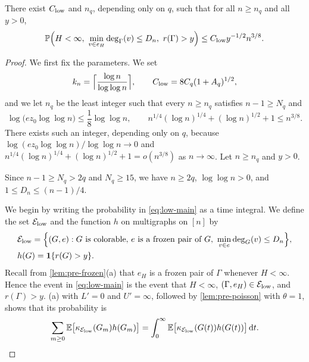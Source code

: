 \begin{theorem}\label{thm:low-main}
There exist $C_{\rm low}$ and $n_q$, depending only on $q$, such that for all $n \ge n_q$ and all $y > 0$,
\begin{equation}\label{eq:low-main}
\Pp\Bigl(H < \infty, \ \min_{v \in e_H} \deg_\Gamma(v) \le D_n, \ r(\Gamma) > y\Bigr) \le C_{\rm low} y^{-1/2} n^{3/8}.
\end{equation}
\end{theorem}

\begin{proof}
We first fix the parameters. We set
\begin{equation*}
k_n = \Bigl\lceil \frac{\log n}{\log \log n} \Bigr\rceil, \qquad C_{\rm low} = 8 C_q (1 + A_q)^{1/2},
\end{equation*}
and we let $n_q$ be the least integer such that every $n \ge n_q$ satisfies $n - 1 \ge N_q$ and
\begin{equation}\label{eq:low-conditions}
\log\bigl(e z_0 \log \log n\bigr) \le \frac{1}{8} \log \log n, \qquad n^{1/4} (\log n)^{1/4} + (\log n)^{1/2} + 1 \le n^{3/8}.
\end{equation}
There exists such an integer, depending only on $q$, because $\log(e z_0 \log \log n)/\log \log n \to 0$ and $n^{1/4} (\log n)^{1/4} + (\log n)^{1/2} + 1 = o(n^{3/8})$ as $n \to \infty$. Let $n \ge n_q$ and $y > 0$.

Since $n - 1 \ge N_q > 2q$ and $N_q \ge 15$, we have $n \ge 2q$, $\log \log n > 0$, and $1 \le D_n \le (n - 1)/4$.

We begin by writing the probability in \eqref{eq:low-main} as a time integral. We define the set $\mathcal E_{\rm low}$ and the function $h$ on multigraphs on $[n]$ by
\begin{equation*}
\begin{aligned}
&\mathcal E_{\rm low} = \Bigl\{(G, e) : G \text{ is colorable, } e \text{ is a frozen pair of } G, \ \min_{v \in e} \deg_G(v) \le D_n\Bigr\}, \\
&h(G) = \mathbf 1\{r(G) > y\}.
\end{aligned}
\end{equation*}
Recall from \cref{lem:pre-frozen}(a) that $e_H$ is a frozen pair of $\Gamma$ whenever $H < \infty$. Hence the event in \eqref{eq:low-main} is the event that $H < \infty$, $(\Gamma, e_H) \in \mathcal E_{\rm low}$, and $r(\Gamma) > y$. (a) with $L' = 0$ and $U' = \infty$, followed by \cref{lem:pre-poisson} with $\theta = 1$, shows that its probability is
\begin{equation}\label{eq:low-step1}
\sum_{m \ge 0} \mathbb E\bigl[\kappa_{\mathcal E_{\rm low}}(G_m) h(G_m)\bigr] = \int_0^\infty \mathbb E\bigl[\kappa_{\mathcal E_{\rm low}}(G(t)) h(G(t))\bigr] \,\mathrm d t.
\end{equation}


\end{proof}
